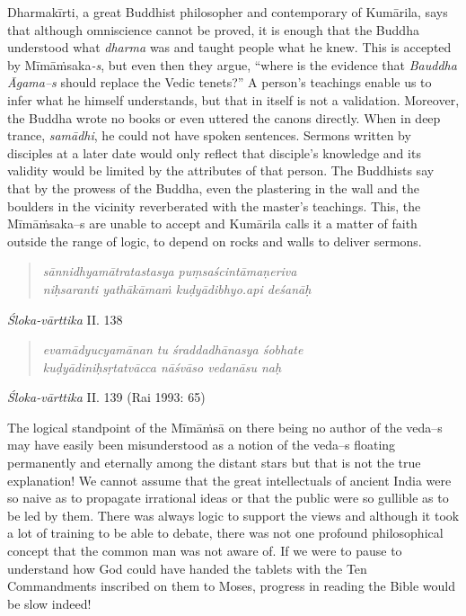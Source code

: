 Dharmakīrti, a great Buddhist philosopher and contemporary of Kumārila, says that although omniscience cannot be proved, it is enough that the Buddha understood what \textit{dharma} was and taught people what he knew. This is accepted by Mīmāṁsaka\textit{-s}, but even then they argue, “where is the evidence that \textit{Bauddha Āgama--s} should replace the Vedic tenets?” A person’s teachings enable us to infer what he himself understands, but that in itself is not a validation. Moreover, the Buddha wrote no books or even uttered the canons directly. When in deep trance, \textit{samādhi}, he could not have spoken sentences. Sermons written by disciples at a later date would only reflect that disciple’s knowledge and its validity would be limited by the attributes of that person. The Buddhists say that by the prowess of the Buddha, even the plastering in the wall and the boulders in the vicinity reverberated with the master’s teachings. This, the Mīmāṁsaka--s are unable to accept and Kumārila calls it a matter of faith outside the range of logic, to depend on rocks and walls to deliver sermons.

\begin{verse}
\textit{sānnidhyamātratastasya puṃsaścintāmaṇeriva }\\
\textit{niḥsaranti yathākāmaṁ kuḍyādibhyo.api deśanāḥ }
\end{verse}

\vspace{-0.5cm} 
\begin{flushright}
 \textit{Śloka-vārttika} II. 138
 \end{flushright}
 
  \begin{verse}
 \textit{evamādyucyamānan tu śraddadhānasya śobhate }\\
 \textit{kuḍyādiniḥsṛtatvācca nāśvāso vedanāsu naḥ }
 \end{verse}
 
 \vspace{-0.5cm} 
 \begin{flushright}
  \textit{Śloka-vārttika} II. 139 (Rai 1993: 65)
  \end{flushright}


The logical standpoint of the Mīmāṁsā on there being no author of the veda--s may have easily been misunderstood as a notion of the veda--s floating permanently and eternally among the distant stars but that is not the true explanation! We cannot assume that the great intellectuals of ancient India were so naive as to propagate irrational ideas or that the public were so gullible as to be led by them. There was always logic to support the views and although it took a lot of training to be able to debate, there was not one profound philosophical concept that the common man was not aware of. If we were to pause to understand how God could have handed the tablets with the Ten Commandments inscribed on them to Moses, progress in reading the Bible would be slow indeed!



